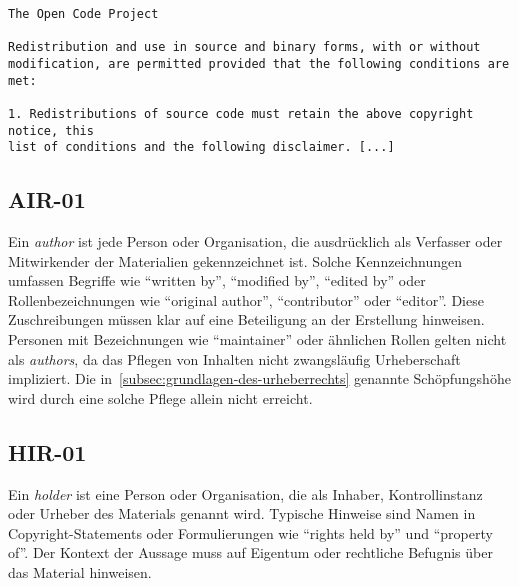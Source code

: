 \begin{lstlisting}[keepspaces=true]
The Open Code Project

Redistribution and use in source and binary forms, with or without
modification, are permitted provided that the following conditions are met:

1. Redistributions of source code must retain the above copyright notice, this
list of conditions and the following disclaimer. [...]
\end{lstlisting}


\subsection{AIR-01}\label{subsec:air-01}

Ein \textit{author} ist jede Person oder Organisation, die ausdrücklich als Verfasser oder Mitwirkender der Materialien gekennzeichnet ist.
Solche Kennzeichnungen umfassen Begriffe wie \enquote{written by}, \enquote{modified by}, \enquote{edited by} oder Rollenbezeichnungen wie \enquote{original author}, \enquote{contributor} oder \enquote{editor}.
Diese Zuschreibungen müssen klar auf eine Beteiligung an der Erstellung hinweisen.
Personen mit Bezeichnungen wie \enquote{maintainer} oder ähnlichen Rollen gelten nicht als \textit{authors}, da das Pflegen von Inhalten nicht zwangsläufig Urheberschaft impliziert.
Die in~\ref{subsec:grundlagen-des-urheberrechts} genannte Schöpfungshöhe wird durch eine solche Pflege allein nicht erreicht.


\subsection{HIR-01}\label{subsec:hir-01}

Ein \textit{holder} ist eine Person oder Organisation, die als Inhaber, Kontrollinstanz oder Urheber des Materials genannt wird.
Typische Hinweise sind Namen in Copyright-Statements oder Formulierungen wie \enquote{rights held by} und \enquote{property of}.
Der Kontext der Aussage muss auf Eigentum oder rechtliche Befugnis über das Material hinweisen.


